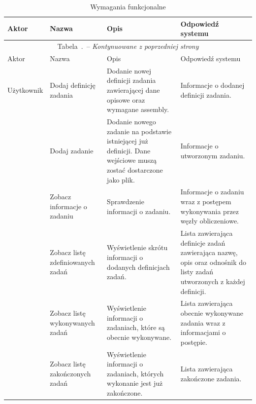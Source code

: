 \documentclass[a4paper,11pt,twoside]{report}
\renewcommand{\tablename}{Tabela}
\renewcommand*{\thetable}{\arabic{chapter}.\arabic{table}}
\theoremstyle{definition}
\begin{document}
            \begin{longtable}{| p{} | p{} | p{} | p{} |}
                \caption{Wymagania funkcjonalne}
                \label{wymagania-funkcjonalne} \\
                \hline
                Aktor & Nazwa & Opis & Odpowiedź systemu \\ \hline
                \endfirsthead
                \multicolumn{4}{c}{\tablename\ \thetable\ -- \textit{Kontynuowane z poprzedniej strony}} \\
                \hline
                Aktor & Nazwa & Opis & Odpowiedź systemu \\ \hline
                \endhead
                
                Użytkownik
                & Dodaj definicję zadania
                & Dodanie nowej definicji zadania zawierającej dane opisowe oraz wymagane assembly.
                & Informacje o dodanej definicji zadania. \\ \cline{2-4} 
                
                & Dodaj zadanie
                & Dodanie nowego zadanie na podstawie istniejącej już definicji. Dane wejściowe muszą zostać dostarczone jako plik.
                & Informacje o utworzonym zadaniu. \\ \cline{2-4} 
                
                & Zobacz informacje o zadaniu
                & Sprawdzenie informacji o zadaniu.
                & Informacje o zadaniu wraz z postępem wykonywania przez węzły obliczeniowe. \\ \cline{2-4} 

                & Zobacz listę zdefiniowanych zadań
                & Wyświetlenie skrótu informacji o dodanych definicjach zadań.
                & Lista zawierająca definicje zadań zawierająca nazwę, opis oraz odnośnik do listy zadań utworzonych z każdej definicji. \\ \cline{2-4} 
                
                & Zobacz listę wykonywanych zadań   
                & Wyświetlenie informacji o zadaniach, które są obecnie wykonywane.                             
                & Lista zawierająca obecnie wykonywane zadania wraz z informacjami o postępie. \\ \cline{2-4} 
                
                & Zobacz listę zakończonych zadań  
                & Wyświetlenie informacji o zadaniach, których wykonanie jest już zakończone.
                & Lista zawierająca zakończone zadania. \\ \cline{2-4} 
                

\end{longtable}
\end{document}
